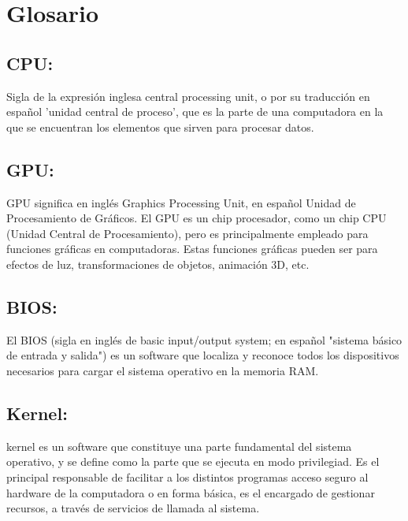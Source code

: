 \documentclass[
  letterpaper, 
  maincolor=black,
  sectioncolor=black!90,
  subsectioncolor=black!70,
  itemtextcolor=black!40,
]{fortysecondscv}
\begin{document}
\makefrontsidebar




\section{Glosario}
    \subsection{CPU:}
    Sigla de la expresión inglesa central processing unit, o por su traducción en español 'unidad central de                  				proceso', que es la parte de una computadora en la que se encuentran los elementos que sirven para procesar 						datos.
    
    \subsection{GPU:}
    GPU significa en inglés Graphics Processing Unit, en español Unidad de Procesamiento de Gráficos. El GPU es un 						chip procesador, como un chip CPU (Unidad Central de Procesamiento), pero es principalmente empleado para 							funciones gráficas en computadoras. Estas funciones gráficas pueden ser para efectos de luz, transformaciones de 				objetos, animación 3D, etc.
    \subsection{BIOS:}
    El BIOS (sigla en inglés de basic input/output system; en español "sistema básico de entrada y salida") es un 						software que localiza y reconoce todos los dispositivos necesarios para cargar el sistema operativo en la 							memoria RAM.
    \subsection{Kernel:}
    kernel es un software que constituye una parte fundamental del sistema operativo, y se define como la parte que 					se ejecuta en modo privilegiad. Es el principal responsable de facilitar a los distintos programas acceso seguro 				al hardware de la computadora o en forma básica, es el encargado de gestionar recursos, a través de servicios de 				llamada al sistema.
\end{document}
